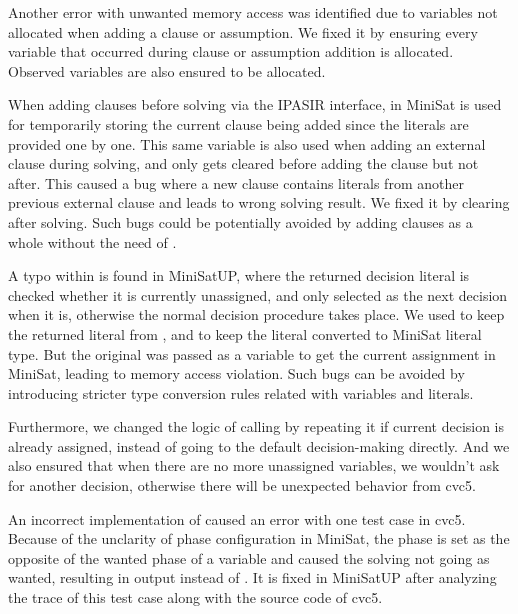 Another error with unwanted memory access was identified due to variables not allocated when adding a clause or assumption. We fixed it by ensuring every variable that occurred during clause or assumption addition is allocated. Observed variables are also ensured to be allocated.

When adding clauses before solving via the IPASIR interface,  in MiniSat is used for temporarily storing the current clause being added since the literals are provided one by one. This same variable is also used when adding an external clause during solving, and only gets cleared before adding the clause but not after. This caused a bug where a new clause contains literals from another previous external clause and leads to wrong solving result. We fixed it by clearing  after solving. Such bugs could be potentially avoided by adding clauses as a whole without the need of .

A typo within  is found in MiniSatUP, where the returned decision literal is checked whether it is currently unassigned, and only selected as the next decision when it is, otherwise the normal decision procedure takes place. We used  to keep the returned literal from , and  to keep the literal converted to MiniSat literal type. But the original  was passed as a variable to get the current assignment in MiniSat, leading to memory access violation. Such bugs can be avoided by introducing stricter type conversion rules related with variables and literals.

Furthermore, we changed the logic of calling  by repeating it if current decision is already assigned, instead of going to the default decision-making directly. And we also ensured that when there are no more unassigned variables, we wouldn't ask for another decision, otherwise there will be unexpected behavior from cvc5.

An incorrect implementation of  caused an error with one test case in cvc5. Because of the unclarity of phase configuration in MiniSat, the phase is set as the opposite of the wanted phase of a variable and caused the solving not going as wanted, resulting in  output instead of . It is fixed in MiniSatUP after analyzing the trace of this test case along with the source code of cvc5.

